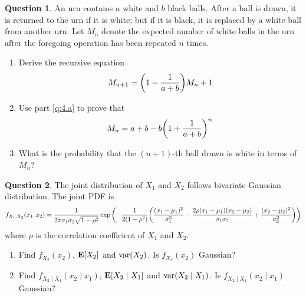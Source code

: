 \documentclass[utf8]{article}
\theoremstyle{definition}%
\newtheorem{question}{Question} %
\theoremstyle{plain}%
\begin{document}
\begin{question}
    An urn contains $a$ white and $b$ black balls. After a ball is drawn, it is returned to the urn if it is white; but if it is black, it is replaced by a white ball from another urn. Let $M_n$ denote the expected number of white balls in the urn after the foregoing operation has been repeated $n$ times.
    \begin{enumerate}[label=(\alph*)]
        \item \label{q:4.a} Derive the recursive equation
        \begin{equation}
            M_{n+1} = \qty(1 - \frac{1}{a + b}) M_n + 1
        \end{equation}
        \item Use part \ref{q:4.a} to prove that
        \begin{equation}
            M_n = a + b - b \qty(1 + \frac{1}{a + b})^n
        \end{equation}
        \item What is the probability that the $(n + 1)$-th ball drawn is white in terms of $M_n$?
    \end{enumerate}
\end{question}

\begin{question}
    The joint distribution of $X_1$ and $X_2$ follows bivariate Gaussian distribution. The joint PDF is
    \begin{equation}
        f_{X_1, X_2}(x_1, x_2) = \frac{1}{2\pi \sigma_1\sigma_2 \sqrt{1 - \rho^2}} \exp\qty(-\frac{1}{2(1 - \rho^2)} \qty(\frac{(x_1-\mu_1)^2}{\sigma_1^2} - \frac{2\rho(x_1-\mu_1)(x_2-\mu_2)}{\sigma_1\sigma_2} + \frac{(x_2-\mu_2)^2}{\sigma_2^2}))
    \end{equation}
    where $\rho$ is the correlation coefficient of $X_1$ and $X_2$.
    \begin{enumerate}[label=(\alph*)]
        \item Find $f_{X_2}(x_2)$, $\mathbf{E}[X_2]$ and $\mathrm{var}(X_2)$. Is $f_{X_2}(x_2)$ Gaussian?
        \item Find $f_{X_2 \mid X_1}(x_2 \mid x_1)$, $\mathbf{E}[X_2 \mid X_1]$ and $\mathrm{var}(X_2 \mid X_1)$. Is $f_{X_2 \mid X_1}(x_2 \mid x_1)$ Gaussian?
    \end{enumerate}
\end{question}
\end{document}
